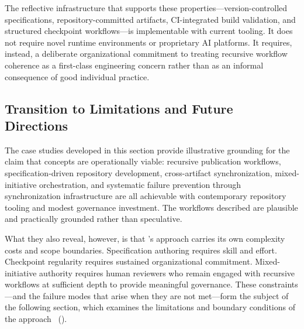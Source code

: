 The reflective infrastructure that supports these properties---version-controlled specifications, repository-committed artifacts, CI-integrated build validation, and structured checkpoint workflows---is implementable with current tooling. It does not require novel runtime environments or proprietary AI platforms. It requires, instead, a deliberate organizational commitment to treating recursive workflow coherence as a first-class engineering concern rather than as an informal consequence of good individual practice.

\subsection{Transition to Limitations and Future Directions}

The case studies developed in this section provide illustrative grounding for the claim that  concepts are operationally viable: recursive publication workflows, specification-driven repository development, cross-artifact synchronization, mixed-initiative orchestration, and systematic failure prevention through synchronization infrastructure are all achievable with contemporary repository tooling and modest governance investment. The workflows described are plausible and practically grounded rather than speculative.

What they also reveal, however, is that 's approach carries its own complexity costs and scope boundaries. Specification authoring requires skill and effort. Checkpoint regularity requires sustained organizational commitment. Mixed-initiative authority requires human reviewers who remain engaged with recursive workflows at sufficient depth to provide meaningful governance. These constraints---and the failure modes that arise when they are not met---form the subject of the following section, which examines the limitations and boundary conditions of the  approach~\cite{Brooks1987NoSilverBullet} ().
